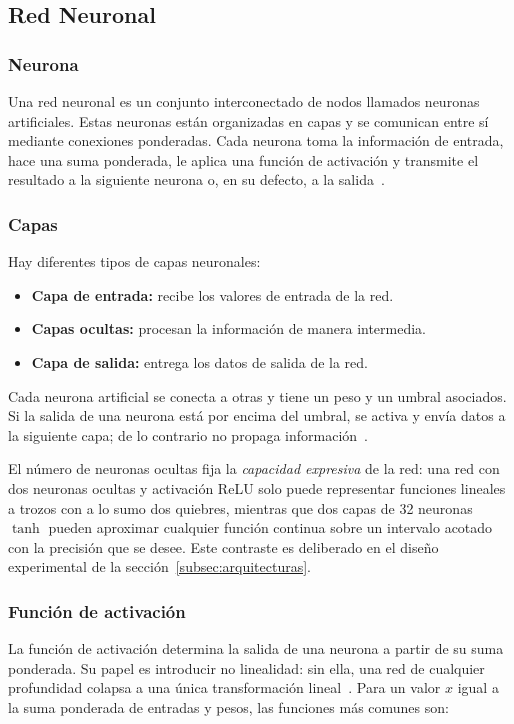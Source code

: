 \documentclass[titlepage,11pt]{article}
\begin{document}
\subsection{Red Neuronal}
\label{subsec:redneuronal}

\subsubsection{Neurona}
Una red neuronal es un conjunto interconectado de nodos llamados neuronas
artificiales. Estas neuronas están organizadas en capas y se comunican entre sí
mediante conexiones ponderadas. Cada neurona toma la información de entrada,
hace una suma ponderada, le aplica una función de activación y transmite el
resultado a la siguiente neurona o, en su defecto, a la
salida~\cite{antonio_2023_introduccin,ibm_qu,santana_2018_1,santana_2018_2,santana_2018_3,santana_2018_3_5}.

\subsubsection{Capas}
Hay diferentes tipos de capas neuronales:
\begin{itemize}
\item \textbf{Capa de entrada:} recibe los valores de entrada de la red.
\item \textbf{Capas ocultas:} procesan la información de manera intermedia.
\item \textbf{Capa de salida:} entrega los datos de salida de la red.
\end{itemize}
Cada neurona artificial se conecta a otras y tiene un peso y un umbral
asociados. Si la salida de una neurona está por encima del umbral, se activa y
envía datos a la siguiente capa; de lo contrario no propaga
información~\cite{antonio_2023_introduccin,ibm_qu}.

El número de neuronas ocultas fija la \emph{capacidad expresiva} de la red: una
red con dos neuronas ocultas y activación ReLU solo puede representar funciones
lineales a trozos con a lo sumo dos quiebres, mientras que dos capas de 32
neuronas $\tanh$ pueden aproximar cualquier función continua sobre un intervalo
acotado con la precisión que se desee. Este contraste es deliberado en el
diseño experimental de la sección~\ref{subsec:arquitecturas}.

\subsubsection{Función de activación}
La función de activación determina la salida de una neurona a partir de su suma
ponderada. Su papel es introducir no linealidad: sin ella, una red de cualquier
profundidad colapsa a una única transformación
lineal~\cite{wikipediacontributors_2018_activation}. Para un valor $x$ igual a
la suma ponderada de entradas y pesos, las funciones más comunes son:
\end{document}
